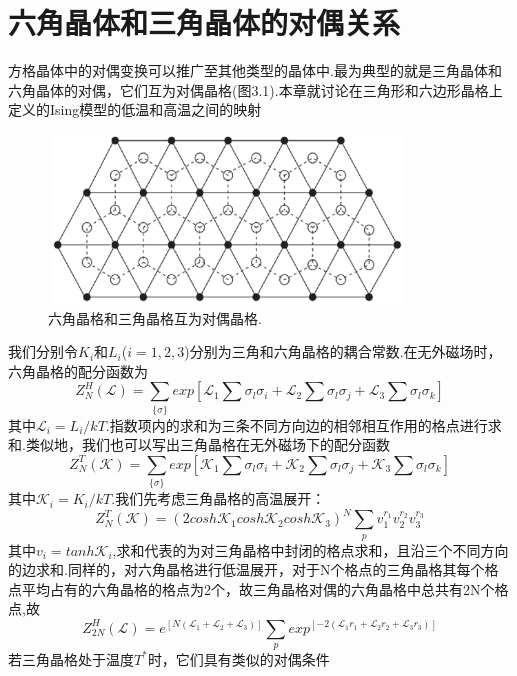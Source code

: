 \documentclass[a4paper]{book}
\begin{document}
\chapter{六角晶体和三角晶体的对偶关系}
方格晶体中的对偶变换可以推广至其他类型的晶体中.最为典型的就是三角晶体和六角晶体的对偶，它们互为对偶晶格(图3.1).本章就讨论在三角形和六边形晶格上定义的Ising模型的低温和高温之间的映射
 \begin{figure}[!h]
	\centering
	\includegraphics[width=9.5cm,height=4.5cm]{figures/5.eps}
	\caption{六角晶格和三角晶格互为对偶晶格.}
\end{figure}
我们分别令$K_i$和$L_i$($i=1,2,3$)分别为三角和六角晶格的耦合常数.在无外磁场时，六角晶格的配分函数为
\begin{equation}
	Z_N^H(\mathcal{L})=\sum_{\{\sigma\}}exp[\mathcal{L}_1\sum \sigma_l\sigma_i+\mathcal{L}_2\sum \sigma_l\sigma_j+\mathcal{L}_3\sum \sigma_l\sigma_k]
\end{equation}
其中$\mathcal{L}_i=L_i/kT$.指数项内的求和为三条不同方向边的相邻相互作用的格点进行求和.类似地，我们也可以写出三角晶格在无外磁场下的配分函数
\begin{equation}
	Z_N^T(\mathcal{K})=\sum_{\{\sigma\}}exp[\mathcal{K}_1\sum \sigma_l\sigma_i+\mathcal{K}_2\sum \sigma_l\sigma_j+\mathcal{K}_3\sum \sigma_l\sigma_k]
\end{equation}
其中$\mathcal{K}_i=K_i/kT$.我们先考虑三角晶格的高温展开：
\begin{equation}
	Z_N^T(\mathcal{K})=(2cosh\mathcal{K}_1cosh\mathcal{K}_2cosh\mathcal{K}_3)^N\sum_{p}v^{r_1}_1v^{r_2}_2v^{r_3}_3
\end{equation}
其中$v_i=tanh\mathcal{K}_i$,求和代表的为对三角晶格中封闭的格点求和，且沿三个不同方向的边求和.同样的，对六角晶格进行低温展开，对于N个格点的三角晶格其每个格点平均占有的六角晶格的格点为2个，故三角晶格对偶的六角晶格中总共有2N个格点,故
\begin{equation}
	Z_{2N}^H(\mathcal{L})=e^{[N(\mathcal{L}_1+\mathcal{L}_2+\mathcal{L}_3)]}\sum_{p}exp^{[-2(\mathcal{L}_1r_1+\mathcal{L}_2r_2+\mathcal{L}_3r_3)]}
\end{equation}
若三角晶格处于温度$T^*$时，它们具有类似的对偶条件
\end{document}
